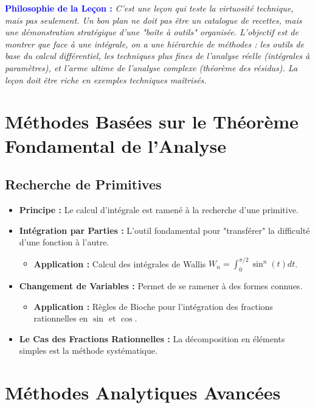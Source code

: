 \documentclass[12pt, a4paper, parskip=full]{report}
\theoremstyle{agregstyle}
\newenvironment{philosophie}
  {\par\medskip\noindent\begin{oframed}\noindent\textbf{\textcolor{blue}{Philosophie de la Leçon :}}\itshape}
  {\end{oframed}\par\medskip}
\begin{document}
\begin{philosophie}
    C'est une leçon qui teste la virtuosité technique, mais pas seulement. Un bon plan ne doit pas être un catalogue de recettes, mais une démonstration stratégique d'une "boîte à outils" organisée. L'objectif est de montrer que face à une intégrale, on a une hiérarchie de méthodes : les outils de base du calcul différentiel, les techniques plus fines de l'analyse réelle (intégrales à paramètres), et l'arme ultime de l'analyse complexe (théorème des résidus). La leçon doit être riche en exemples techniques maîtrisés.
\end{philosophie}

\section{Méthodes Basées sur le Théorème Fondamental de l'Analyse}
\subsection{Recherche de Primitives}
\begin{itemize}
    \item \textbf{Principe :} Le calcul d'intégrale est ramené à la recherche d'une primitive.
    \item \textbf{Intégration par Parties :} L'outil fondamental pour "transférer" la difficulté d'une fonction à l'autre.
        \begin{itemize}
            \item \textbf{Application :} Calcul des intégrales de Wallis $W_n = \int_0^{\pi/2} \sin^n(t) dt$.
        \end{itemize}
    \item \textbf{Changement de Variables :} Permet de se ramener à des formes connues.
        \begin{itemize}
            \item \textbf{Application :} Règles de Bioche pour l'intégration des fractions rationnelles en $\sin$ et $\cos$.
        \end{itemize}
    \item \textbf{Le Cas des Fractions Rationnelles :} La décomposition en éléments simples est la méthode systématique.
\end{itemize}

\section{Méthodes Analytiques Avancées}
\end{document}
